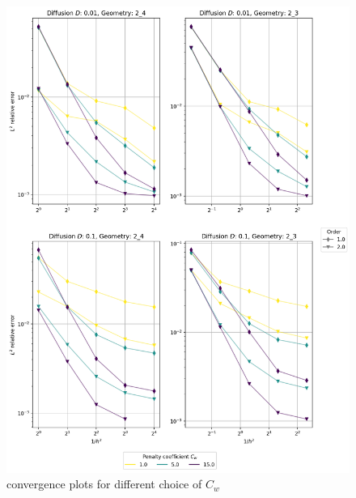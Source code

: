 \begin{figure}[p!]
	\includegraphics[width=\textwidth]{../figs/parametric/burgers_2D/convergence_symmetry}
	\caption{ convergence plots for different choice of $C_w$}
	\label{fig:kucera_conv}
\end{figure}